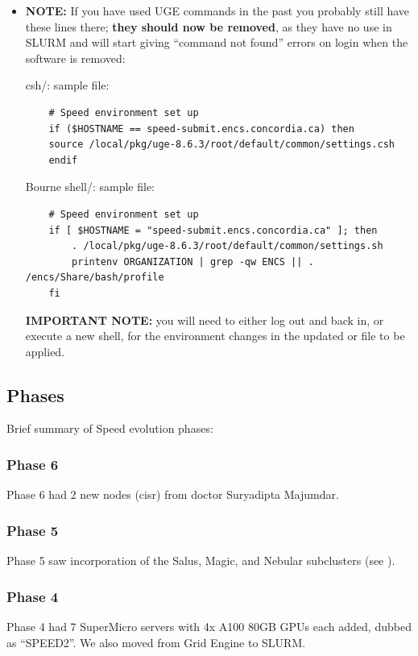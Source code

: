 \begin{itemize}
\item
\textbf{NOTE:} If you have used UGE commands in the past you probably still have these
lines there; \textbf{they should now be removed}, as they have no use in SLURM and
will start giving ``command not found'' errors on login when the software is removed:

csh/: sample  file:
\scriptsize
\begin{verbatim}
    # Speed environment set up
    if ($HOSTNAME == speed-submit.encs.concordia.ca) then
    source /local/pkg/uge-8.6.3/root/default/common/settings.csh
    endif
\end{verbatim}
\normalsize
Bourne shell/: sample  file:
\scriptsize
\begin{verbatim}
    # Speed environment set up
    if [ $HOSTNAME = "speed-submit.encs.concordia.ca" ]; then
        . /local/pkg/uge-8.6.3/root/default/common/settings.sh
        printenv ORGANIZATION | grep -qw ENCS || . /encs/Share/bash/profile
    fi
\end{verbatim}
\normalsize

\textbf{IMPORTANT NOTE:} you will need to either log out and back in, or execute a new shell, 
for the environment changes in the updated  or  file to be applied.
\end{itemize}

\subsection{Phases}
\label{sect:phases}

Brief summary of Speed evolution phases:

\subsubsection{Phase 6}
Phase 6 had 2 new nodes (cisr) from doctor Suryadipta Majumdar.

\subsubsection{Phase 5}
Phase 5 saw incorporation of the Salus, Magic, and Nebular
subclusters (see ).

\subsubsection{Phase 4}
Phase 4 had 7 SuperMicro servers with 4x A100 80GB GPUs each added,
dubbed as ``SPEED2''. We also moved from Grid Engine to SLURM.


